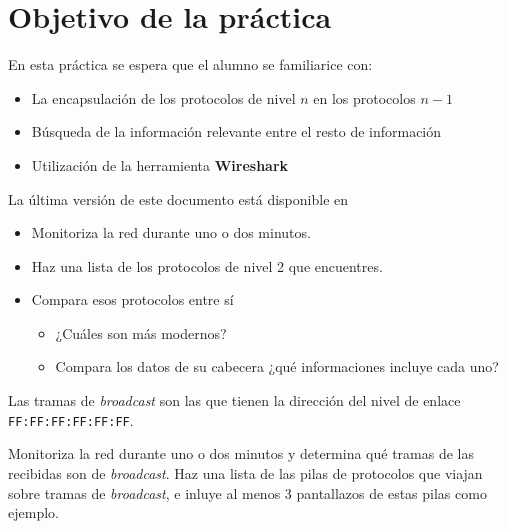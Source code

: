 

\renewcommand{\hmwkTitle}{Análisis de tráfico con \textbf{Wireshark}}

\renewcommand{\hmwkClass}{Plan. y Admin. de Redes}




\primerapagina


\section{Objetivo de la práctica}
En esta práctica se espera que el alumno se familiarice con:
\begin{itemize}
\item La encapsulación de los protocolos de nivel $n$ en los protocolos $n-1$
\item Búsqueda de la información relevante entre el resto de información
\item Utilización de la herramienta \textbf{Wireshark}
  
\end{itemize}

La última versión de este documento está disponible en 

\begin{homeworkProblem}

  \begin{itemize}
  \item Monitoriza la red durante uno o dos minutos. 
  \item Haz una lista de los protocolos de nivel 2 que encuentres.
  \item Compara esos protocolos entre sí
    \begin{itemize}
    \item ¿Cuáles son más modernos?
    \item Compara los datos de su cabecera ¿qué informaciones incluye cada uno?
    \end{itemize}
  \end{itemize}
  
\end{homeworkProblem}

\begin{homeworkProblem}

  Las tramas de \textit{broadcast} son las que tienen la dirección del nivel de enlace \texttt{FF:FF:FF:FF:FF:FF}.

  Monitoriza la red durante uno o dos minutos y determina qué tramas de las recibidas son de \textit{broadcast}. Haz una lista de las pilas de protocolos que viajan sobre tramas de \textit{broadcast}, e inluye al menos 3 pantallazos de estas pilas como ejemplo.

\end{homeworkProblem}


